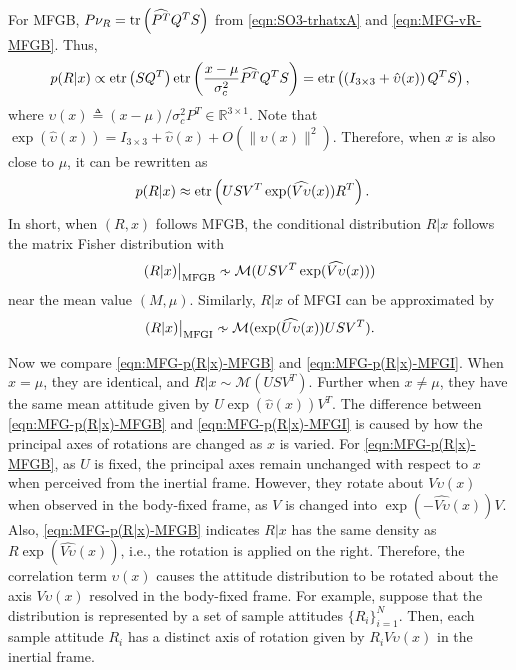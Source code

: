 For MFGB, $P\nu_R = \mathrm{tr}\left( \widehat{P^T} Q^TS \right)$ from \eqref{eqn:SO3-trhatxA} and \eqref{eqn:MFG-vR-MFGB}.
Thus,
\begin{align*} 
	p(R|x) \propto \mathrm{etr}\left( SQ^T \right) \mathrm{etr}\left( \frac{x-\mu}{\sigma_c^2} \widehat{P^T} Q^TS \right) = \mathrm{etr}\left( \left(I_{3\times 3} + \hat{\upsilon}(x)\right) Q^TS \right),
\end{align*}
where $\upsilon(x) \triangleq (x-\mu)/\sigma_c^2 P^T \in \mathbb{R}^{3\times 1}$.
Note that $\exp(\hat\upsilon(x))=I_{3\times 3} + \hat\upsilon(x) + O(\|\upsilon(x)\|^2)$.
Therefore, when $x$ is also close to $\mu$, it can be rewritten as
\begin{align*}
	p(R|x) &\approx \mathrm{etr}\left( USV^T\exp(\widehat{V\upsilon}(x))R^T \right).
\end{align*}
In short, when $(R,x)$ follows MFGB, the conditional distribution $R|x$ follows the matrix Fisher distribution with
\begin{align} \label{eqn:MFG-p(R|x)-MFGB}
	(R|x)\big|_{\text{MFGB}} \approxsim \mathcal{M}(USV^T\exp(\widehat{V\upsilon}(x))) 
\end{align}
near the mean value $(M,\mu)$. 
Similarly, $R|x$ of MFGI can be approximated by
\begin{align} \label{eqn:MFG-p(R|x)-MFGI}
	(R|x)\big|_\text{MFGI} \approxsim \mathcal{M}(\exp(\widehat{U\upsilon}(x))USV^T).
\end{align}

Now we compare \eqref{eqn:MFG-p(R|x)-MFGB} and \eqref{eqn:MFG-p(R|x)-MFGI}.
When $x=\mu$, they are identical, and $R|x \sim \mathcal{M}(USV^T)$. 
Further when $x\neq \mu$, they have the same mean attitude given by $U\exp(\hat{\upsilon}(x))V^T$.
The difference between \eqref{eqn:MFG-p(R|x)-MFGB} and \eqref{eqn:MFG-p(R|x)-MFGI} is caused by how the principal axes of rotations are changed as $x$ is varied. 
For \eqref{eqn:MFG-p(R|x)-MFGB}, as $U$ is fixed, the principal axes remain unchanged with respect to $x$ when perceived from the inertial frame.
However, they rotate about $V\upsilon(x)$ when observed in the body-fixed frame, as $V$ is changed into $\exp(-\widehat{V\upsilon}(x))V$.
Also, \eqref{eqn:MFG-p(R|x)-MFGB} indicates $R|x$ has the same density as $R\exp(\widehat{V\upsilon}(x))$, i.e., the rotation is applied on the right.
Therefore, the correlation term $\upsilon(x)$ causes the attitude distribution to be rotated about the axis $V\upsilon(x)$ resolved in the body-fixed frame.
For example, suppose that the distribution is represented by a set of sample attitudes $\{R_i\}_{i=1}^N$. 
Then, each sample attitude $R_i$ has a distinct axis of rotation given by $R_i V\upsilon(x)$ in the inertial frame.

